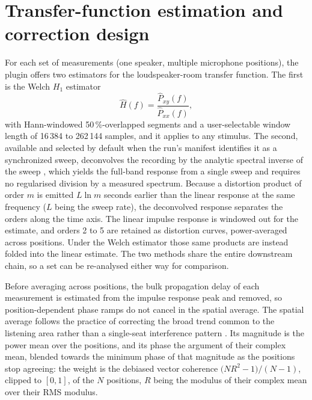 \documentclass[10pt,a4paper]{article}
\begin{document}
\section{Transfer-function estimation and correction design}\label{sec:correction}

For each set of measurements (one speaker, multiple microphone positions), the plugin offers two estimators for the loudspeaker-room transfer function. The first is the Welch $H_1$ estimator \cite{Welch1967}
\begin{equation}
  \hat H(f) = \frac{\hat P_{xy}(f)}{\hat P_{xx}(f)},
\end{equation}
with Hann-windowed 50\,\%-overlapped segments and a user-selectable window length of 16\,384 to 262\,144 samples, and it applies to any stimulus. The second, available and selected by default when the run's manifest identifies it as a synchronized sweep, deconvolves the recording by the analytic spectral inverse of the sweep \cite{Novak2015}, which yields the full-band response from a single sweep and requires no regularised division by a measured spectrum. Because a distortion product of order $m$ is emitted $L\ln m$ seconds earlier than the linear response at the same frequency ($L$ being the sweep rate), the deconvolved response separates the orders along the time axis. The linear impulse response is windowed out for the estimate, and orders 2 to 5 are retained as distortion curves, power-averaged across positions. Under the Welch estimator those same products are instead folded into the linear estimate. The two methods share the entire downstream chain, so a set can be re-analysed either way for comparison.

Before averaging across positions, the bulk propagation delay of each measurement is estimated from the impulse response peak and removed, so position-dependent phase ramps do not cancel in the spatial average. The spatial average follows the practice of correcting the broad trend common to the listening area rather than a single-seat interference pattern \cite{Toole, Mourjopoulos1994}. Its magnitude is the power mean over the positions, and its phase the argument of their complex mean, blended towards the minimum phase of that magnitude as the positions stop agreeing: the weight is the debiased vector coherence $\bigl(N R^2-1\bigr)/(N-1)$, clipped to $[0,1]$, of the $N$ positions, $R$ being the modulus of their complex mean over their RMS modulus.
\end{document}
